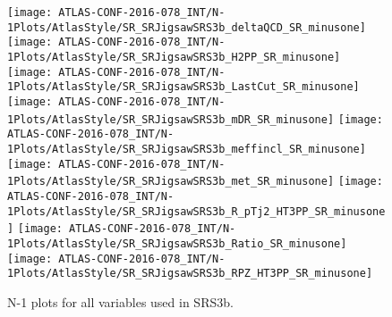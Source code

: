 \begin{figure}[tbp]
\begin{center}
\texttt{[image: ATLAS-CONF-2016-078\_INT/N-1Plots/AtlasStyle/SR\_SRJigsawSRS3b\_deltaQCD\_SR\_minusone]}
\texttt{[image: ATLAS-CONF-2016-078\_INT/N-1Plots/AtlasStyle/SR\_SRJigsawSRS3b\_H2PP\_SR\_minusone]}
\texttt{[image: ATLAS-CONF-2016-078\_INT/N-1Plots/AtlasStyle/SR\_SRJigsawSRS3b\_LastCut\_SR\_minusone]}
\texttt{[image: ATLAS-CONF-2016-078\_INT/N-1Plots/AtlasStyle/SR\_SRJigsawSRS3b\_mDR\_SR\_minusone]}
\texttt{[image: ATLAS-CONF-2016-078\_INT/N-1Plots/AtlasStyle/SR\_SRJigsawSRS3b\_meffincl\_SR\_minusone]}
\texttt{[image: ATLAS-CONF-2016-078\_INT/N-1Plots/AtlasStyle/SR\_SRJigsawSRS3b\_met\_SR\_minusone]}
\texttt{[image: ATLAS-CONF-2016-078\_INT/N-1Plots/AtlasStyle/SR\_SRJigsawSRS3b\_R\_pTj2\_HT3PP\_SR\_minusone]}
\texttt{[image: ATLAS-CONF-2016-078\_INT/N-1Plots/AtlasStyle/SR\_SRJigsawSRS3b\_Ratio\_SR\_minusone]}
\texttt{[image: ATLAS-CONF-2016-078\_INT/N-1Plots/AtlasStyle/SR\_SRJigsawSRS3b\_RPZ\_HT3PP\_SR\_minusone]}
\end{center}
\caption{N-1 plots for all variables used in SRS3b.}
\label{fig:SR_SRJigsawSRS3a_meffincl_SR_minusone}
\end{figure}
